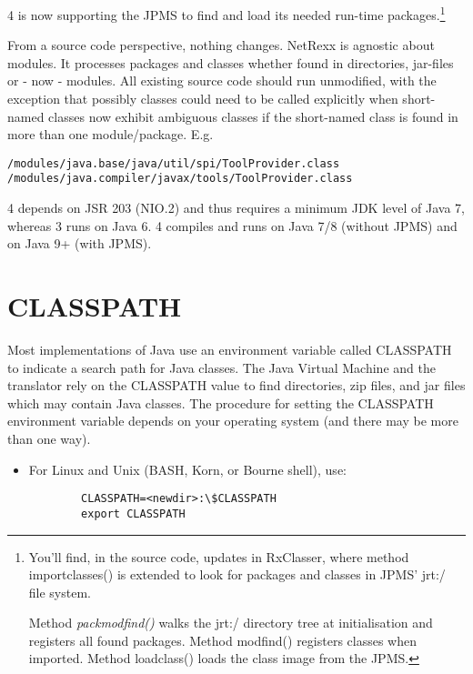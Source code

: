 {\nr{} 4 is now supporting the JPMS to find and load its needed run-time
packages.\footnote{You'll find, in the \nr{} source code, updates in RxClasser, where method importclasses() is extended to look
for packages and classes in JPMS' jrt:/ file system.

Method \emph{packmodfind()} walks the jrt:/ directory tree at initialisation and
registers all found packages. Method modfind() registers classes when imported.
Method loadclass() loads the class image from the JPMS.}

From a \nr{} source code perspective, nothing changes. NetRexx is agnostic
about modules. It processes packages and classes whether found in directories,
jar-files or - now - modules.
All existing source code should run unmodified, with the exception that possibly
classes could need to be called explicitly when short-named classes now
exhibit ambiguous classes if the short-named class is found in more than one
module/package.
E.g.
\begin{verbatim}
/modules/java.base/java/util/spi/ToolProvider.class
/modules/java.compiler/javax/tools/ToolProvider.class
\end{verbatim}

\nr{} 4 depends on JSR 203 (NIO.2) and thus requires a minimum JDK level of Java 7,
whereas \nr{} 3 runs on Java 6.
\nr{} 4 compiles and runs on Java 7/8 (without JPMS) and on Java 9+ (with JPMS).
\section{CLASSPATH}
Most implementations of Java use an environment variable called
CLASSPATH to indicate a search path for Java classes. The Java Virtual
Machine and the \nr{} translator rely on the CLASSPATH value to find directories, zip files, and jar files which may contain Java classes. 
The procedure for setting the CLASSPATH environment variable depends on your operating system (and there may be more than one way).
\begin{itemize}
\item For Linux and Unix (BASH, Korn, or Bourne shell), use:
\begin{verbatim}
        CLASSPATH=<newdir>:\$CLASSPATH 
        export CLASSPATH
\end{verbatim}


\end{itemize}}
